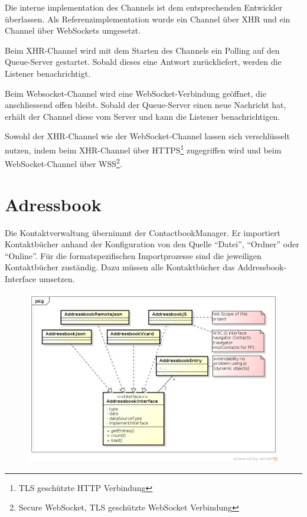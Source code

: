 	Die interne implementation des Channels ist dem entsprechenden Entwickler überlassen. Als Referenzimplementation wurde ein Channel über XHR und ein Channel über WebSockets umgesetzt. 
	
	Beim XHR-Channel wird mit dem Starten des Channels ein Polling auf den Queue-Server gestartet. Sobald dieses eine Antwort zurückliefert, werden die Listener benachrichtigt. 
	
	Beim Websocket-Channel wird eine WebSocket-Verbindung geöffnet, die anschliessend offen bleibt. Sobald der Queue-Server einen neue Nachricht hat, erhält der Channel diese vom Server und kann die Listener benachrichtigen.
	
	Sowohl der XHR-Channel wie der WebSocket-Channel lassen sich verschlüsselt nutzen, indem beim XHR-Channel über HTTPS\footnote{TLS geschützte HTTP Verbindung} zugegriffen wird und beim WebSocket-Channel über WSS\footnote{Secure WebSocket, TLS geschützte WebSocket Verbindung}.
	

\section{Adressbook}
	Die Kontaktverwaltung übernimmt der ContactbookManager. Er importiert Kontaktbücher anhand der Konfiguration von den Quelle "`Datei"', "`Ordner"' oder "`Online"'. Für die formatspezifischen Importprozesse sind die jeweiligen Kontaktbücher zuständig. Dazu müssen alle Kontaktbücher das Addressbook-Interface umsetzen.
	\begin{figure}[H]
		\centering
		\includegraphics[width=\textwidth]{../architekturanalayse/img/addressbook.png}
	\end{figure}

